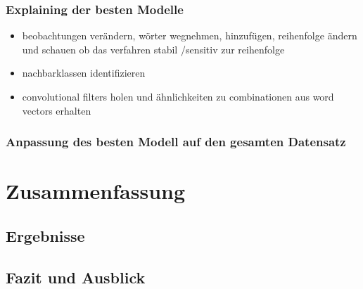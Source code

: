 \documentclass[a4paper,11pt]{article}
\begin{document}
\subsubsection{Explaining der besten Modelle}

\begin{itemize}
    \item beobachtungen verändern, wörter wegnehmen, hinzufügen, reihenfolge ändern und schauen ob das verfahren stabil /sensitiv zur reihenfolge
    \item nachbarklassen identifizieren
    \item convolutional filters holen und ähnlichkeiten zu combinationen aus word vectors erhalten
\end{itemize}{}

\subsubsection{Anpassung des besten Modell auf den gesamten Datensatz}

\section{Zusammenfassung}

\subsection{Ergebnisse}
\subsection{Fazit und Ausblick}

\newpage

\printbibliography[
heading=bibintoc,
title={Literaturverzeichnis}
]
\end{document}
